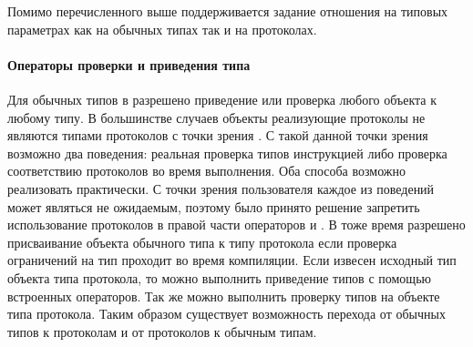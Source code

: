 Помимо перечисленного выше поддерживается задание отношения на типовых параметрах как на обычных типах так и на протоколах.

\paragraph{Операторы проверки и приведения типа}
Для обычных типов в  разрешено приведение или проверка любого объекта к любому типу. В большинстве случаев объекты реализующие протоколы не являются типами протоколов с точки зрения . С такой данной точки зрения возможно два поведения: реальная проверка типов инструкцией  либо проверка соответствию протоколов во время выполнения. Оба способа возможно реализовать практически. С точки зрения пользователя каждое из поведений может являться не ожидаемым, поэтому было принято решение запретить использование протоколов в правой части операторов  и . В тоже время разрешено присваивание объекта обычного типа к типу протокола если проверка ограничений на тип проходит во время компиляции. Если извесен исходный тип объекта типа протокола, то можно выполнить приведение типов с помощью встроенных операторов. Так же можно выполнить проверку типов на объекте типа протокола. Таким образом существует возможность перехода от обычных типов к протоколам и от протоколов к обычным типам.
